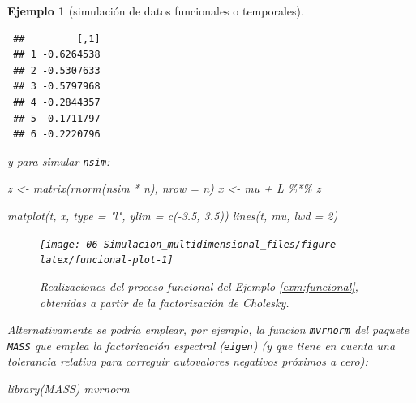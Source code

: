 \documentclass[
]{book}
\newenvironment{Shaded}{\begin{snugshade}}{\end{snugshade}}
\newcommand{\AttributeTok}[1]{\textcolor[rgb]{0.77,0.63,0.00}{#1}}
\newcommand{\DecValTok}[1]{\textcolor[rgb]{0.00,0.00,0.81}{#1}}
\newcommand{\FloatTok}[1]{\textcolor[rgb]{0.00,0.00,0.81}{#1}}
\newcommand{\FunctionTok}[1]{\textcolor[rgb]{0.00,0.00,0.00}{#1}}
\newcommand{\NormalTok}[1]{#1}
\newcommand{\OtherTok}[1]{\textcolor[rgb]{0.56,0.35,0.01}{#1}}
\newcommand{\SpecialCharTok}[1]{\textcolor[rgb]{0.00,0.00,0.00}{#1}}
\newcommand{\StringTok}[1]{\textcolor[rgb]{0.31,0.60,0.02}{#1}}
\theoremstyle{break}
\newtheorem{example}{Ejemplo}[chapter]
\theoremstyle{nonumberplain}
\begin{document}
\begin{example}[simulación de datos funcionales o temporales]
\begin{verbatim}
 ##         [,1]
 ## 1 -0.6264538
 ## 2 -0.5307633
 ## 3 -0.5797968
 ## 4 -0.2844357
 ## 5 -0.1711797
 ## 6 -0.2220796
\end{verbatim}

y para simular \texttt{nsim}:



\begin{Shaded}
\begin{Highlighting}[]
\NormalTok{z }\OtherTok{\textless{}{-}} \FunctionTok{matrix}\NormalTok{(}\FunctionTok{rnorm}\NormalTok{(nsim }\SpecialCharTok{*}\NormalTok{ n), }\AttributeTok{nrow =}\NormalTok{ n)}
\NormalTok{x }\OtherTok{\textless{}{-}}\NormalTok{ mu }\SpecialCharTok{+}\NormalTok{ L }\SpecialCharTok{\%*\%}\NormalTok{ z}

\FunctionTok{matplot}\NormalTok{(t, x, }\AttributeTok{type =} \StringTok{"l"}\NormalTok{, }\AttributeTok{ylim =} \FunctionTok{c}\NormalTok{(}\SpecialCharTok{{-}}\FloatTok{3.5}\NormalTok{, }\FloatTok{3.5}\NormalTok{))}
\FunctionTok{lines}\NormalTok{(t, mu, }\AttributeTok{lwd =} \DecValTok{2}\NormalTok{)}
\end{Highlighting}
\end{Shaded}

\begin{figure}[!htb]

{\centering \texttt{[image: 06-Simulacion\_multidimensional\_files/figure-latex/funcional-plot-1]} 

}

\caption{Realizaciones del proceso funcional del Ejemplo \ref{exm:funcional}, obtenidas a partir de la factorización de Cholesky.}\label{fig:funcional-plot}
\end{figure}

Alternativamente se podría emplear, por ejemplo, la funcion \texttt{mvrnorm}
del paquete \texttt{MASS} que emplea la factorización espectral (\texttt{eigen}) (y que tiene en cuenta una tolerancia relativa para correguir autovalores negativos próximos a cero):



\begin{Shaded}
\begin{Highlighting}[]
\FunctionTok{library}\NormalTok{(MASS)}
\NormalTok{mvrnorm}
\end{Highlighting}
\end{Shaded}


\end{example}
\end{document}
